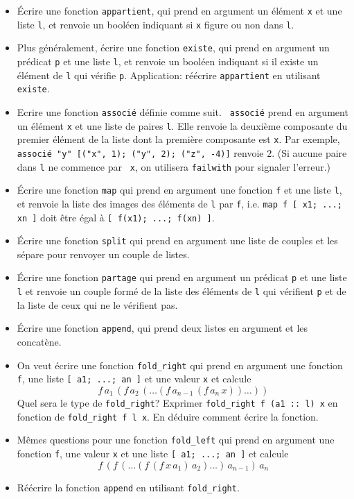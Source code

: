 \documentclass[11pt,a4paper]{article}
\begin{document}
\begin{itemize}
\item \'{E}crire une fonction {\tt appartient}, qui prend en
      argument un élément {\tt x} et une liste {\tt l}, et renvoie un
      booléen indiquant si {\tt x} figure ou non dans {\tt l}.
\item Plus généralement, écrire une fonction {\tt existe}, qui prend
      en argument un prédicat {\tt p} et une liste {\tt l}, et renvoie
      un booléen indiquant si il existe un élément de {\tt l} qui
      vérifie {\tt p}.  Application: réécrire {\tt appartient} en
      utilisant {\tt existe}.
\item Ecrire une fonction {\tt associé} définie comme suit. {\tt
      associé} prend en argument un élément {\tt x} et une liste de
      paires {\tt l}. Elle renvoie la deuxième composante du premier
      élément de la liste dont la première composante est {\tt x}. Par
      exemple, \verb+associé "y" [("x", 1); ("y", 2); ("z", -4)]+
      renvoie $2$. (Si aucune paire dans {\tt l} ne commence par {\tt
      x}, on utilisera {\tt failwith} pour signaler l'erreur.)
\item \'{E}crire une fonction {\tt map} qui prend en argument une
      fonction {\tt f} et une liste {\tt l}, et renvoie la liste des
      images des éléments de {\tt l} par {\tt f}, i.e. \texttt{map f [
      x1; ...; xn ]} doit être égal à \texttt{[ f(x1); ...; f(xn) ]}.
\item \'{E}crire une fonction {\tt split} qui prend en argument une liste
      de couples et les sépare pour renvoyer un couple de listes.
\item \'{E}crire une fonction {\tt partage} qui prend en argument un
      prédicat {\tt p} et une liste {\tt l} et renvoie un couple formé
      de la liste des éléments de {\tt l} qui vérifient {\tt p} et de
      la liste de ceux qui ne le vérifient pas.
\item \'{E}crire une fonction {\tt append}, qui prend deux listes en
      argument et les concatène.
\item On veut écrire une fonction \verb+fold_right+ qui prend en argument
      une fonction {\tt f}, une liste \verb+[ a1; ...; an ]+ et une
      valeur {\tt x} et calcule $$f \, a_1 \, (f \, a_2 \, ( \ldots (f
      \, a_{n-1} \, (f \, a_n \, x)) \ldots ))$$ Quel sera le type de
      \verb+fold_right+? Exprimer \verb+fold_right f (a1 :: l) x+ en
      fonction de \verb+fold_right f l x+. En déduire comment écrire la
      fonction.
\item Mêmes questions pour une fonction \verb+fold_left+ qui prend en
      argument une fonction {\tt f}, une valeur {\tt x} et une liste
      \verb+[ a1; ...; an ]+ et calcule $$f \, (f \, (\ldots (f \, (f
      \, x \, a_1) \, a_2) \ldots ) \, a_{n-1}) \, a_n$$
\item Réécrire la fonction {\tt append} en utilisant \verb+fold_right+.
\end{itemize}
\end{document}
